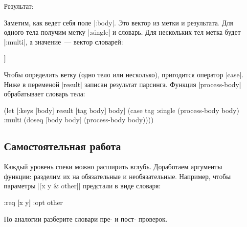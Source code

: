 \noindent
Результат:

\begin{english}
\end{english}

Заметим, как ведет себя поле \spverb|:body|. Это вектор из метки и
результата. Для одного тела получим метку \spverb|:single| и словарь. Для
нескольких тел метка будет \spverb|:multi|, а значение~--- вектор словарей:

\begin{english}
  \begin{clojure}
[:multi [{:args [x] :code [(println 1)]}
         {:args [x y] :code [(println 2)]}]]
  \end{clojure}
\end{english}

Чтобы определить ветку (одно тело или несколько), пригодится оператор
\spverb|case|. Ниже в переменой \spverb|result| записан результат
парсинга. Функция \spverb|process-body| обрабатывает словарь тела:

\begin{english}
  \begin{clojure}
(let [{:keys [body]} result
      [tag body] body]
  (case tag
    :single
    (process-body body)
    :multi
    (doseq [body body]
      (process-body body))))
  \end{clojure}
\end{english}

\subsection{Самостоятельная работа}

Каждый уровень спеки можно расширить вглубь. Доработаем аргументы функции:
разделим их на обязательные и необязательные. Например, чтобы параметры
\spverb|[x y & other]| предстали в виде словаря:

\begin{english}
  \begin{clojure}
{:req [x y] :opt other}
  \end{clojure}
\end{english}

\noindent
По аналогии разберите словари пре- и пост- проверок.

